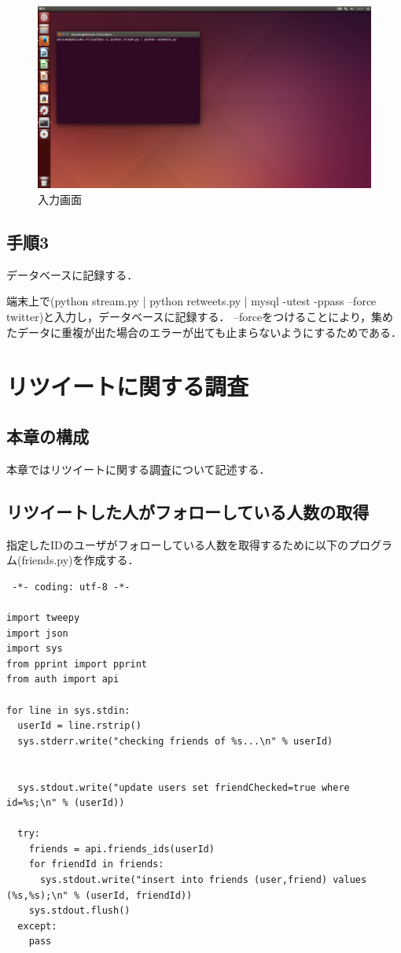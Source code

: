 \begin{figure}[H]
\centering
\includegraphics[width=15cm]{retweetspy.png}
\caption{入力画面}\label{retweets.pyの画像}
\end{figure}




\subsection{手順3}
データベースに記録する．

端末上で(python stream.py | python retweets.py | mysql -utest -ppass --force twitter)と入力し，データベースに記録する．
--forceをつけることにより，集めたデータに重複が出た場合のエラーが出ても止まらないようにするためである．

\clearpage

\section{リツイートに関する調査}

\subsection{本章の構成}
本章ではリツイートに関する調査について記述する．

\subsection{リツイートした人がフォローしている人数の取得}
指定したIDのユーザがフォローしている人数を取得するために以下のプログラム(friends.py)を作成する．

\begin{lstlisting}
 -*- coding: utf-8 -*-

import tweepy
import json
import sys
from pprint import pprint
from auth import api

for line in sys.stdin:
  userId = line.rstrip()
  sys.stderr.write("checking friends of %s...\n" % userId)
  
  
  sys.stdout.write("update users set friendChecked=true where id=%s;\n" % (userId))
  
  try:
    friends = api.friends_ids(userId)
    for friendId in friends:
      sys.stdout.write("insert into friends (user,friend) values (%s,%s);\n" % (userId, friendId))
    sys.stdout.flush()
  except:
    pass

\end{lstlisting}

